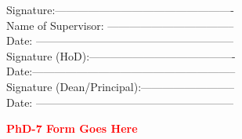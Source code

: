 \documentclass[a4paper,12pt,one side]{report}
\theoremstyle{definition}
\begin{document}
\vspace{1cm}
\begin{flushright}
Signature:------------------------------------------------- \\	\vspace{.3cm}				Name of Supervisor: ----------------------------------- \\	\vspace{.3cm}			
Date: ------------------------------------------------------\\ \vspace{.8cm}
Signature (HoD):----------------------------------------\\	\vspace{.3cm}				
Date:--------------------------------------------------------\\ \vspace{.8cm}
Signature (Dean/Principal):--------------------------\\	\vspace{.3cm}		
Date: ------------------------------------------------------								
\end{flushright}
\newpage
{}
\thispagestyle{empty}
\begin{center}
    

\bf  \textcolor{red}{{PhD-7 Form Goes Here}}
\end{center}
\end{document}
